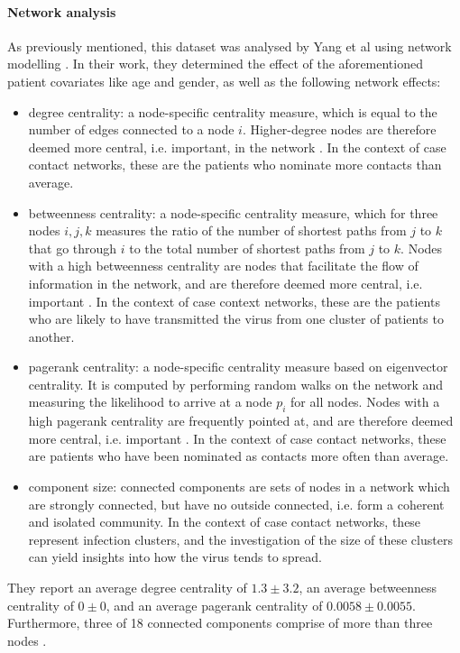 \paragraph{Network analysis}
As previously mentioned, this dataset was analysed by Yang et al using network modelling \cite{hainan_publication}. In their work, they determined the effect of the aforementioned patient covariates like age and gender, as well as the following network effects:
\begin{itemize}
	\item degree centrality: a node-specific centrality measure, which is equal to the number of edges connected to a node $i$. Higher-degree nodes are therefore deemed more central, i.e. important, in the network \cite{golbeck}. In the context of case contact networks, these are the patients who nominate more contacts than average.
	\item betweenness centrality: a node-specific centrality measure, which for three nodes $i,j,k$ measures the ratio of the number of shortest paths from $j$ to $k$ that go through $i$ to the total number of shortest paths from $j$ to $k$. Nodes with a high betweenness centrality are nodes that facilitate the flow of information in the network, and are therefore deemed more central, i.e. important \cite{golbeck}. In the context of case context networks, these are the patients who are likely to have transmitted the virus from one cluster of patients to another.
	\item pagerank centrality: a node-specific centrality measure based on eigenvector centrality. It is computed by performing random walks on the network and measuring the likelihood to arrive at a node $p_i$ for all nodes. Nodes with a high pagerank centrality are frequently pointed at, and are therefore deemed more central, i.e. important \cite{gleich_pagerank}. In the context of case contact networks, these are patients who have been nominated as contacts more often than average.
	\item component size: connected components are sets of nodes in a network which are strongly connected, but have no outside connected, i.e. form a coherent and isolated community. In the context of case contact networks, these represent infection clusters, and the investigation of the size of these clusters can yield insights into how the virus tends to spread.
\end{itemize} They report an average degree centrality of $1.3\pm3.2$, an average betweenness centrality of $0\pm0$, and an average pagerank centrality of $0.0058\pm0.0055$. Furthermore, three of 18 connected components comprise of more than three nodes \cite{hainan_publication}. 

